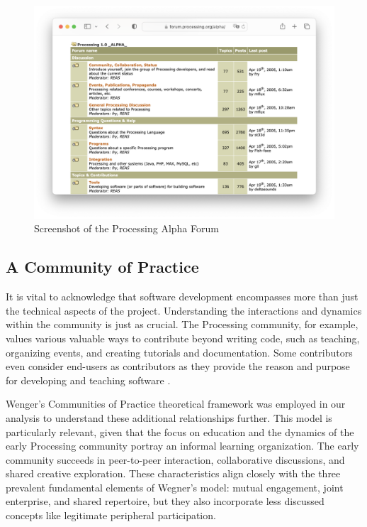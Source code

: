 
\begin{figure}
	\centering
	\includegraphics[width=1.0\textwidth]{images/alpha-browser.png}
	\caption{Screenshot of the Processing Alpha Forum}
	\label{fig:processing-alpha}
\end{figure}

\subsection{A Community of Practice}
It is vital to acknowledge that software development encompasses more than just the technical aspects of the project. Understanding the interactions and dynamics within the community is just as crucial. The Processing community, for example, values various valuable ways to contribute beyond writing code, such as teaching, organizing events, and creating tutorials and documentation. Some contributors even consider end-users as contributors as they provide the reason and purpose for developing and teaching software \parencite[41]{processingfoundation20thAnniversaryProcessing2022}. 

Wenger’s Communities of Practice \parencite{wengerCommunitiesPracticeLearning1998} theoretical framework was employed in our analysis to understand these additional relationships further. This model is particularly relevant, given that the focus on education and the dynamics of the early Processing community portray an informal learning organization. The early community succeeds in peer-to-peer interaction, collaborative discussions, and shared creative exploration. These characteristics align closely with the three prevalent fundamental elements of Wegner’s model: mutual engagement, joint enterprise, and shared repertoire, but they also incorporate less discussed concepts like legitimate peripheral participation. 

